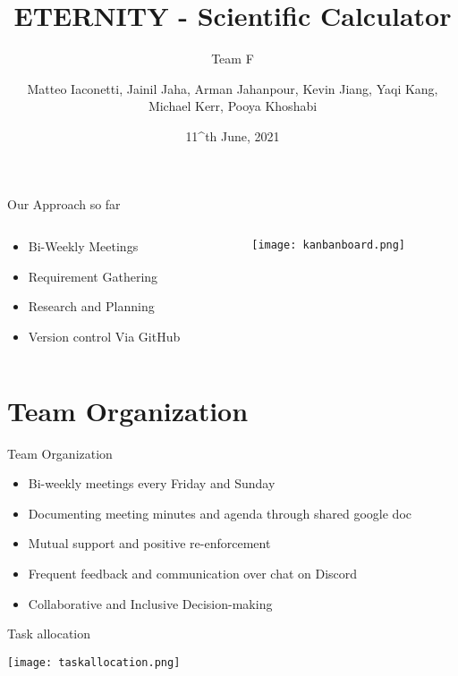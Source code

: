 \documentclass{beamer}
\title{ETERNITY - Scientific Calculator}
\subtitle{Team F}
\date{11^{th}  June, 2021}
\author{Matteo Iaconetti, Jainil Jaha, Arman Jahanpour, Kevin Jiang, Yaqi Kang, Michael Kerr, Pooya Khoshabi}
\institute{\textbf{Concordia University} - Comp 354}
\begin{document}
{
\begin{frame}
  \maketitle
  \thispagestyle{empty}
\end{frame}
}
\addtocounter{framenumber}{-1}


\begin{frame}{Our Approach so far}
\begin{columns}
    \begin{column}{0.3\textwidth}
        \begin{itemize}
            \item Bi-Weekly Meetings
            \item Requirement Gathering
            \item Research and Planning
            \item Version control Via GitHub
        \end{itemize}
    \end{column}
    \begin{column}{0.7\textwidth}
        \texttt{[image: kanbanboard.png]}
    \end{column}
\end{columns}
\end{frame}

\section{Team Organization}

\begin{frame}[fragile]{Team Organization}
      \begin{itemize}
          \item Bi-weekly meetings every Friday and Sunday
          \item Documenting meeting minutes and agenda through shared google doc
          \item Mutual support and positive re-enforcement
          \item Frequent feedback and communication over chat on Discord
          \item Collaborative and Inclusive Decision-making
      \end{itemize}
\end{frame}


\begin{frame}{Task allocation}

    \vspace*{-6.5mm}    
    \hspace*{-11mm}
    \texttt{[image: taskallocation.png]}
    
\end{frame}
\end{document}
